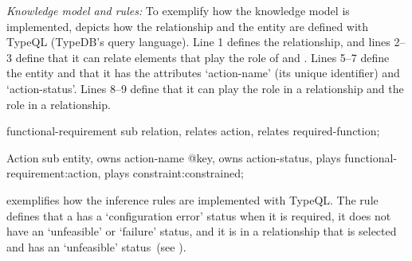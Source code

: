 \textit{Knowledge model and rules:}
To exemplify how the knowledge model is implemented,  depicts how the  relationship and the  entity are defined with TypeQL (TypeDB's query language). Line 1 defines the  relationship, and lines 2--3 define that it can relate elements that play the role of  and . Lines 5--7 define the  entity and that it has the attributes `action-name' (its unique identifier) and `action-status'. Lines 8--9 define that it can play the  role in a  relationship and the  role in a  relationship.

\par\medskip\noindent\begin{minipage}{\linewidth}
\captionsetup{type=listing}
\begin{Piton}[language=TypeQL, line-numbers={skip-empty-lines=false, label-empty-lines=false}]
functional-requirement sub relation,
  relates action,
  relates required-function;

Action sub entity,
  owns action-name @key,
  owns action-status,
  plays functional-requirement:action,
  plays constraint:constrained;
\end{Piton}
\caption{TypeQL query to define  and }%
\label{lst:km}
\end{minipage}\par\medskip

 exemplifies how the inference rules are implemented with TypeQL\@. The  rule defines that a  has a `configuration error' status when it is required, it does not have an `unfeasible' or `failure' status, and it is in a  relationship that is selected and has an `unfeasible' status~(see ).

